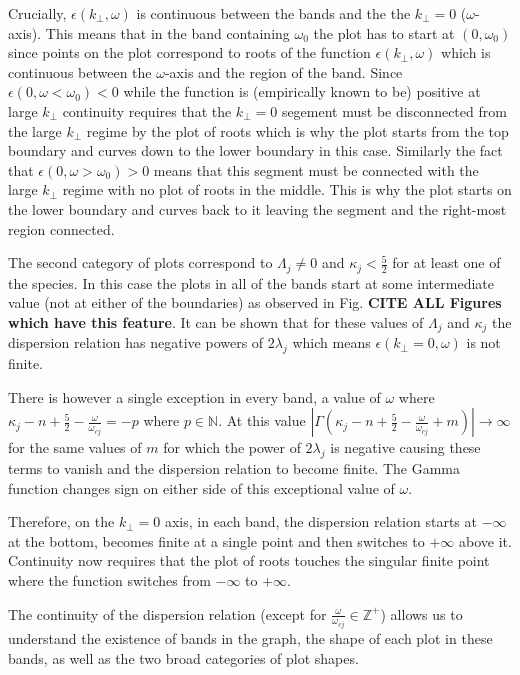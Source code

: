 \documentclass[12pt,a4paper]{article}
\begin{document}
    Crucially, $\epsilon(k_\perp, \omega)$ is continuous between the bands and the the $k_\perp = 0$ ($\omega$-axis).
    This means that in the band containing $\omega_0$ the plot has to start at $(0, \omega_0)$ since points on the plot correspond to roots of the function $\epsilon(k_\perp, \omega)$ which is continuous between the $\omega$-axis and the region of the band.
    Since $\epsilon(0, \omega < \omega_0) < 0$ while the function is (empirically known to be) positive at large $k_\perp$ continuity requires that the $k_\perp = 0$ segement must be disconnected from the large $k_\perp$ regime by the plot of roots which is why the plot starts from the top boundary and curves down to the lower boundary in this case.
    Similarly the fact that $\epsilon(0, \omega > \omega_0) > 0$ means that this segment must be connected with the large $k_\perp$ regime with no plot of roots in the middle.
    This is why the plot starts on the lower boundary and curves back to it leaving the segment and the right-most region connected.

    The second category of plots correspond to $\Lambda_j \neq 0$ and $\kappa_j < \frac{5}{2}$ for at least one of the species.
    In this case the plots in all of the bands start at some intermediate value (not at either of the boundaries) as observed in Fig. \textbf{CITE ALL Figures which have this feature}.
    It can be shown that for these values of $\Lambda_j$ and $\kappa_j$ the dispersion relation has negative powers of $2 \lambda_j$ which means $\epsilon(k_\perp = 0, \omega)$ is not finite.

    There is however a single exception in every band, a value of $\omega$ where $\kappa_j - n + \frac{5}{2} - \frac{\omega}{\omega_{cj}} = -p$ where $p \in \mathbb{N}$.
    At this value $\left| \Gamma (\kappa_j - n + \frac{5}{2} - \frac{\omega}{\omega_{cj}} + m) \right| \rightarrow \infty$ for the same values of $m$ for which the power of $2 \lambda_j$ is negative causing these terms to vanish and the dispersion relation to become finite.
    The Gamma function changes sign on either side of this exceptional value of $\omega$.

    Therefore, on the $k_\perp = 0$ axis, in each band, the dispersion relation starts at $-\infty$ at the bottom, becomes finite at a single point and then switches to $+\infty$ above it.
    Continuity now requires that the plot of roots touches the singular finite point where the function switches from $-\infty$ to $+\infty$.

    The continuity of the dispersion relation (except for $\frac{\omega}{\omega_{cj}} \in \mathbb{Z}^+$) allows us to understand the existence of bands in the graph, the shape of each plot in these bands, as well as the two broad categories of plot shapes.
\end{document}
